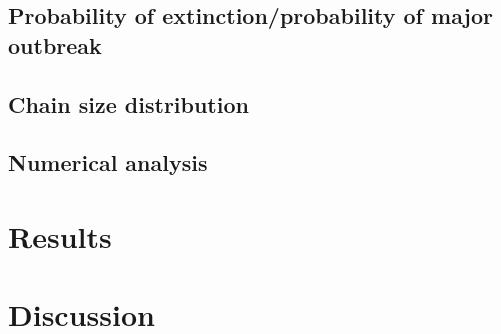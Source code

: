 \documentclass{imammb}
\numberwithin{equation}{section}
\begin{document}
\subsection{Probability of extinction/probability of major outbreak}

\subsection{Chain size distribution}


\subsection{Numerical analysis} %


\section{Results}

\section{Discussion}


 










\end{document}
